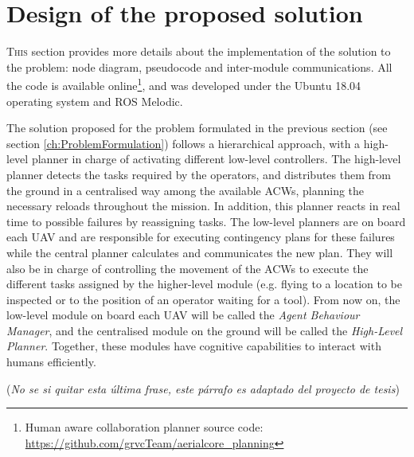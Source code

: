 \chapter{Design of the proposed solution}
\label{ch:DesignOfTheProposedSolution}
\lettrine[lraise=-0.1, lines=2, loversize=0.2]{T}{his} section provides more details about the implementation of the solution to the problem: node diagram, pseudocode and inter-module communications. All the code is available online\footnote{Human aware collaboration planner source code: \url{https://github.com/grvcTeam/aerialcore_planning}}, and was developed under the Ubuntu 18.04 operating system and ROS Melodic.

The solution proposed for the problem formulated in the previous section (see section \ref{ch:ProblemFormulation}) follows a hierarchical approach, with a high-level planner in charge of activating different low-level controllers. The high-level planner detects the tasks required by the operators, and distributes them from the ground in a centralised way among the available \glspl{ACW}, planning the necessary reloads throughout the mission. In addition, this planner reacts in real time to possible failures by reassigning tasks. The low-level planners are on board each \gls{UAV} and are responsible for executing contingency plans for these failures while the central planner calculates and communicates the new plan. They will also be in charge of controlling the movement of the \glspl{ACW} to execute the different tasks assigned by the higher-level module (e.g. flying to a location to be inspected or to the position of an operator waiting for a tool). From now on, the low-level module on board each \gls{UAV} will be called the \emph{Agent Behaviour Manager}, and the centralised module on the ground will be called the \emph{High-Level Planner}. Together, these modules have cognitive capabilities to interact with humans efficiently. 

(\emph{No se si quitar esta última frase, este párrafo es adaptado del proyecto de tesis})


